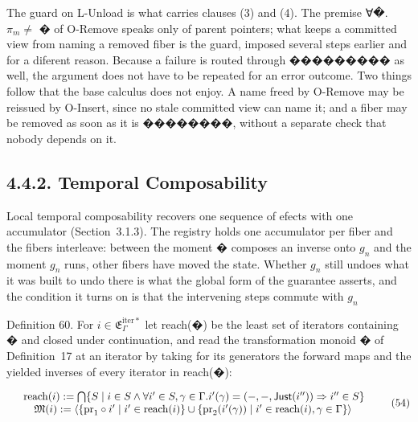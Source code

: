 \documentclass[
  10
]{article}
\begin{document}
The guard on L-Unload is what carries clauses (3) and (4). The premise
∀�. \(\pi _ { m } \neq\) � of O-Remove speaks only of parent pointers;
what keeps a committed view from naming a removed fiber is the guard,
imposed several steps earlier and for a diferent reason. Because a
failure is routed through ��������� as well, the argument does not have
to be repeated for an error outcome. Two things follow that the base
calculus does not enjoy. A name freed by O-Remove may be reissued by
O-Insert, since no stale committed view can name it; and a fiber may be
removed as soon as it is ��������, without a separate check that nobody
depends on it.

\subsection{4.4.2. Temporal Composability}\label{temporal-composability}

Local temporal composability recovers one sequence of efects with one
accumulator (Section~3.1.3). The registry holds one accumulator per
fiber and the fibers interleave: between the moment � composes an
inverse onto \(g _ { n }\) and the moment \(g _ { n }\) runs, other
fibers have moved the state. Whether \(g _ { n }\) still undoes what it
was built to undo there is what the global form of the guarantee
asserts, and the condition it turns on is that the intervening steps
commute with \(g _ { n }\)

Definition 60. For
\(i \in { \mathfrak { E } } _ { \Gamma } ^ { \mathrm { i t e r * } }\)
let reach(�) be the least set of iterators containing � and closed under
continuation, and read the transformation monoid � of Definition~17 at
an iterator by taking for its generators the forward maps and the
yielded inverses of every iterator in reach(�):

\[
\begin{array} { r l } & { \mathrm { r e a c h } ( i ) : = \bigcap \{ S \mid i \in S \land \forall i ^ { \prime } \in S , \gamma \in \Gamma . i ^ { \prime } ( \gamma ) = ( - , - , \mathsf { J u s t } ( i ^ { \prime \prime } ) ) \Rightarrow i ^ { \prime \prime } \in S \} } \\ & { \quad \mathfrak { M } ( i ) : = \langle \{ \mathrm { p r } _ { 1 } \circ i ^ { \prime } \mid i ^ { \prime } \in \mathrm { r e a c h } ( i ) \} \cup \{ \mathrm { p r } _ { 2 } ( i ^ { \prime } ( \gamma ) ) \mid i ^ { \prime } \in \mathrm { r e a c h } ( i ) , \gamma \in \Gamma \} \rangle } \end{array}\tag{54}
\]
\end{document}

